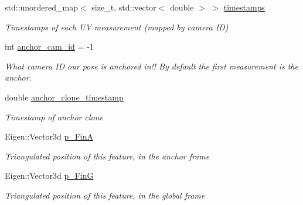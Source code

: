 \begin{DoxyCompactItemize}
std\+::unordered\+\_\+map$<$ size\+\_\+t, std\+::vector$<$ double $>$ $>$ \hyperlink{classov__core_1_1Feature_a16de72ae07065bc81570d63ec694d743}{timestamps}
\begin{DoxyCompactList}\small\item\em Timestamps of each UV measurement (mapped by camera ID) \end{DoxyCompactList}\item 
\mbox{\label{classov__core_1_1Feature_a9d3c50ff0d0e511fc859d6537c90f192}} 
int \hyperlink{classov__core_1_1Feature_a9d3c50ff0d0e511fc859d6537c90f192}{anchor\+\_\+cam\+\_\+id} = -\/1
\begin{DoxyCompactList}\small\item\em What camera ID our pose is anchored in!! By default the first measurement is the anchor. \end{DoxyCompactList}\item 
\mbox{\label{classov__core_1_1Feature_abf559a10ad1ccf1ba44500d2c81fc765}} 
double \hyperlink{classov__core_1_1Feature_abf559a10ad1ccf1ba44500d2c81fc765}{anchor\+\_\+clone\+\_\+timestamp}
\begin{DoxyCompactList}\small\item\em Timestamp of anchor clone \end{DoxyCompactList}\item 
\mbox{\label{classov__core_1_1Feature_a7c7616f29b0a254a12cdb6244c1f5953}} 
Eigen\+::\+Vector3d \hyperlink{classov__core_1_1Feature_a7c7616f29b0a254a12cdb6244c1f5953}{p\+\_\+\+FinA}
\begin{DoxyCompactList}\small\item\em Triangulated position of this feature, in the anchor frame \end{DoxyCompactList}\item 
\mbox{\label{classov__core_1_1Feature_a5e9697cf6bd37a344ddaff0631778278}} 
Eigen\+::\+Vector3d \hyperlink{classov__core_1_1Feature_a5e9697cf6bd37a344ddaff0631778278}{p\+\_\+\+FinG}
\begin{DoxyCompactList}\small\item\em Triangulated position of this feature, in the global frame \end{DoxyCompactList}\end{DoxyCompactItemize}


